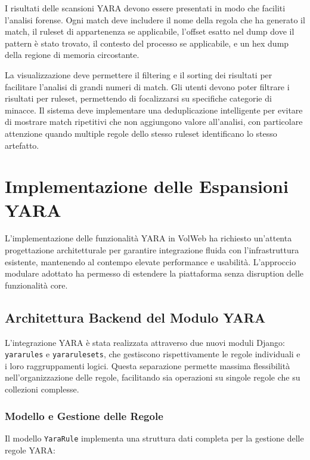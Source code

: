 I risultati delle scansioni YARA devono essere presentati in modo che faciliti l'analisi forense. Ogni match deve includere il nome della regola che ha generato il match, il ruleset di appartenenza se applicabile, l'offset esatto nel dump dove il pattern è stato trovato, il contesto del processo se applicabile, e un hex dump della regione di memoria circostante.

La visualizzazione deve permettere il filtering e il sorting dei risultati per facilitare l'analisi di grandi numeri di match. Gli utenti devono poter filtrare i risultati per ruleset, permettendo di focalizzarsi su specifiche categorie di minacce. Il sistema deve implementare una deduplicazione intelligente per evitare di mostrare match ripetitivi che non aggiungono valore all'analisi, con particolare attenzione quando multiple regole dello stesso ruleset identificano lo stesso artefatto.

\section{Implementazione delle Espansioni YARA}

L'implementazione delle funzionalità YARA in VolWeb ha richiesto un'attenta progettazione architetturale per garantire integrazione fluida con l'infrastruttura esistente, mantenendo al contempo elevate performance e usabilità. L'approccio modulare adottato ha permesso di estendere la piattaforma senza disruption delle funzionalità core.

\subsection{Architettura Backend del Modulo YARA}

L'integrazione YARA è stata realizzata attraverso due nuovi moduli Django: \texttt{yararules} e \texttt{yararulesets}, che gestiscono rispettivamente le regole individuali e i loro raggruppamenti logici. Questa separazione permette massima flessibilità nell'organizzazione delle regole, facilitando sia operazioni su singole regole che su collezioni complesse.

\subsubsection{Modello e Gestione delle Regole}

Il modello \texttt{YaraRule} implementa una struttura dati completa per la gestione delle regole YARA:

